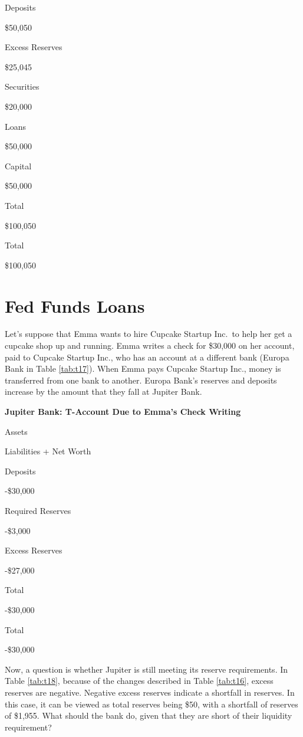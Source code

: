 \documentclass[
]{book}
\begin{document}
Deposits

\$50,050

Excess Reserves

\$25,045

Securities

\$20,000

Loans

\$50,000

Capital

\$50,000

Total

\$100,050

Total

\$100,050

\hypertarget{fed-funds-loans}{%
\section{Fed Funds Loans}\label{fed-funds-loans}}

Let's suppose that Emma wants to hire Cupcake Startup Inc.~to help her get a cupcake shop up and running. Emma writes a check for \$30,000 on her account, paid to Cupcake Startup Inc., who has an account at a different bank (Europa Bank in Table \ref{tab:t17}). When Emma pays Cupcake Startup Inc., money is transferred from one bank to another. Europa Bank's reserves and deposits increase by the amount that they fall at Jupiter Bank.

\label{tab:t16}\textbf{Jupiter Bank: T-Account Due to Emma's Check Writing}

Assets

Liabilities + Net Worth

Deposits

-\$30,000

Required Reserves

-\$3,000

Excess Reserves

-\$27,000

Total

-\$30,000

Total

-\$30,000

Now, a question is whether Jupiter is still meeting its reserve requirements. In Table \ref{tab:t18}, because of the changes described in Table \ref{tab:t16}, excess reserves are negative. Negative excess reserves indicate a shortfall in reserves. In this case, it can be viewed as total reserves being \$50, with a shortfall of reserves of \$1,955. What should the bank do, given that they are short of their liquidity requirement?
\end{document}
